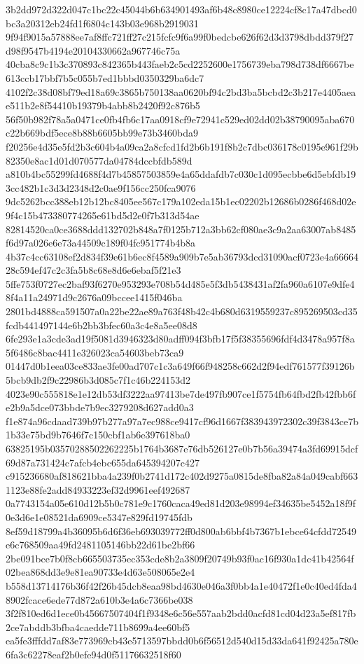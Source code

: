 \documentclass[11pt,a4paper]{article}
\begin{document}
{3b2dd972d322d047c1bc22c45044b6b634901493af6b48c8980ce12224cf8c17a47dbcd0bc3a20312eb24fd1f6804c143b03e968b2919031
9f94f9015a57888ee7af8ffc721ff27c215fcfc9f6a99f0bedcbe626f62d3d3798dbdd379f27d98f9547b4194e20104330662a967746c75a
40cba8c9c1b3c370893c842365b443faeb2c5cd2252600e1756739eba798d738df6667be613ccb17bbf7b5c055b7ed1bbbd0350329ba6dc7
4102f2c38d08bf79ed18a69c3865b750138aa0620bf94c2bd3ba5bcbd2c3b217e4405aeae511b2e8f54410b19379b4abb8b2420f92c876b5
56f50b982f78a5a0471ce0fb4fb6c17aa0918cf9e72941c529ed02dd02b38790095aba670c22b669bdf5ece8b88b6605bb99e73b3460bda9
f20256e4d35e5fd2b3c604b4a09ca2a8cfcd1fd2b6b191f8b2c7dbc036178c0195e961f29b82350e8ac1d01d070577da04784dccbfdb589d
a810b4bc55299fd4688f4d7b45857503859e4a65ddafdb7c030c1d095ecbbe6d5ebfdb193cc482b1c3d3d2348d2c0ae9f156cc250fca9076
9dc5262bcc388eb12b12bc8405ee567c179a102eda15b1ec02202b12686b0286f468d02e9f4c15b473380774265e61bd5d2e0f7b313d54ae
82814520ca0ce3688ddd132702b848a7f0125b712a3bb62cf080ae3c9a2aa63007ab8485f6d97a026e6e73a44509c189f04fc951774b4b8a
4b37c4cc63108ef2d834f39e61b6ec8f4589a909b7e5ab36793dcd31090acf0723e4a6666428c594ef47c2c3fa5b8c68e8d6e6ebaf5f21e3
5ffe753f0727ec2baf93f6270e953293e708b54d485e5f3db5438431af2fa960a6107e9dfe48f4a11a24971d9c2676a09bccee1415f046ba
2801bd4888ca591507a0a22be22ae89a763f48b42c4b680d6319559237c895269503cd35fcdb441497144e6b2bb3bfec60a3c4e8a5ee08d8
6fe293e1a3cde3ad19f5081d3946323d80adff094f3bfb17f5f38355696fdf4d3478a957f8a5f6486c8bac4411e326023ca54603beb73ca9
01447d0b1eea03ce833ae3fe00ad707c1c3a649f66f948258c662d2f94edf761577f39126b5bcb9db2f9c22986b3d085c7f1c46b224153d2
4023e90c555818e1e12db53df3222aa97413be7de497fb907ce1f5754fb64fbd2fb42fbb6fe2b9a5dce073bbde7b9ec3279208d627add0a3
f1e874a96cdaad739b97b277a97a7ec988ce9417cf96d1667f383943972302c39f3843ce7b1b33e75bd9b7646f7c150cbf1ab6e397618ba0
63825195b03570288502262225b1764b3687e76db526127e0b7b56a39474a3fd69915dcf69d87a731424c7afcb4ebc655da645394207c427
c915236680af818621bba4a239f0b2741d172c402d9275a0815de8fba82a84a049cabf6631123e88fe2add84933223ef32d9961eef492687
0a7743154a05e610d12b5b0c781e9c1760caca49ed81d203e98994ef34635be5452a18f9f0e3d6e1e08521da6909ce5347e829fd19745fdb
8ef59d18799a4b36095b6d6f36eb693039772ff0d800ab6bbf4b7367b1ebce64cfdd72549e6c768509aa49fd2481105146bb22d61be2bf66
2be091bce7b0f8cb665503735ec353cde8b2a3809f20749b93f0ac16f930a1dc41b42564f02bea868dd3e9e81ea90733e4d63e508065e2e4
b558d13714176b36f42f26b45dcb8eaa98bd4630e046a3f0bb4a1e40472f1e0c40ed4fda48902fcace6ede77d872a610b3e4a6c7366be038
3f2f810ed6d1ece0b45667507404f1f9348e6c56e557aab2bdd0acfd81cd04d23a5ef817fb2ce7abddb3bfba4caedde711b8699a4ee60bf5
ea5fe3fffdd7af83e773969cb43e5713597bbdd0b6f56512d540d15d33da641f92425a780e6fa3c62278eaf2b0efe94d0f51176632518f60
}
\end{document}
